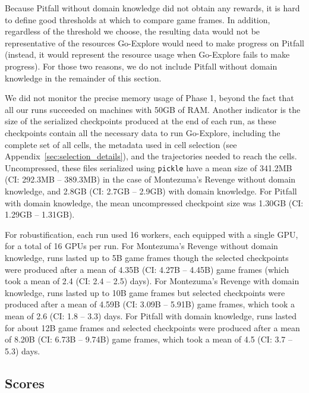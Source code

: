\documentclass{article}
\newcommand{\pivotci}[2]{(CI: #1 -- #2)}  \newcommand{\percci}[2]{}  \newcommand{\tpivotci}[2]{(#1 -- #2)}  \newcommand{\tpercci}[2]{}  \newcommand{\na}[0]{-}
\begin{document}
Because Pitfall without domain knowledge did not obtain any rewards, it is hard to define good thresholds at which to compare game frames. In addition, regardless of the threshold we choose, the resulting data would not be representative of the resources Go-Explore would need to make progress on Pitfall (instead, it would represent the resource usage when Go-Explore fails to make progress). For those two reasons, we do not include Pitfall without domain knowledge in the remainder of this section.

We did not monitor the precise memory usage of Phase 1, beyond the fact that all our runs succeeded on machines with 50GB of RAM. Another indicator is the size of the serialized checkpoints produced at the end of each run, as these checkpoints contain all the necessary data to run Go-Explore, including the complete set of all cells, the metadata used in cell selection (see Appendix~\ref{sec:selection_details}), and the trajectories needed to reach the cells. Uncompressed, these files serialized using \texttt{pickle} have a mean size of 341.2MB \pivotci{292.3MB}{389.3MB}\percci{294.2MB}{390.5MB} in the case of Montezuma's Revenge without domain knowledge, and 2.8GB \pivotci{2.7GB}{2.9GB}\percci{2.7GB}{2.9GB} with domain knowledge. For Pitfall with domain knowledge, the mean uncompressed checkpoint size was 1.30GB \pivotci{1.29GB}{1.31GB}\percci{1.29GB}{1.31GB}.


For robustification, each run used 16 workers, each equipped with a single GPU, for a total of 16 GPUs per run. For Montezuma's Revenge without domain knowledge, runs lasted up to 5B game frames though the selected checkpoints were produced after a mean of 4.35B \pivotci{4.27B}{4.45B}\percci{4.25B}{4.43B} game frames (which took a mean of 2.4 \pivotci{2.4}{2.5}\percci{2.4}{2.5} days). For Montezuma's Revenge with domain knowledge, runs lasted up to 10B game frames but selected checkpoints were produced after a mean of 4.59B \pivotci{3.09B}{5.91B}\percci{3.26B}{6.05B} game frames, which took a mean of 2.6 \pivotci{1.8}{3.3}\percci{1.9}{3.4} days. For Pitfall with domain knowledge, runs lasted for about 12B game frames and selected checkpoints were produced after a mean of 8.20B \pivotci{6.73B}{9.74B}\percci{6.63B}{9.70B} game frames, which took a mean of 4.5 \pivotci{3.7}{5.3}\percci{3.6}{5.3} days.

\FloatBarrier

\subsection{Scores}
\label{sec:scores}
\end{document}
